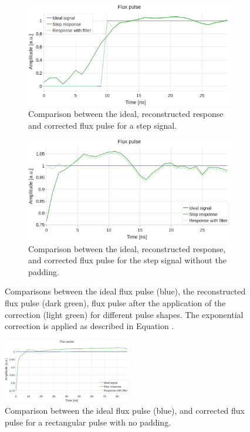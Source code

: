 \begin{figure}[h!]
    \centering
    \begin{subfigure}[t]{0.495\textwidth}
        \includegraphics[width=\textwidth]{figures/png/Cryoscope/filters/step_inverse.png}
        \caption{Comparison between the ideal, reconstructed response and corrected flux pulse for a step signal.}
        \label{fig:inverse:step}
    \end{subfigure}
    \hfill
    \begin{subfigure}[t]{0.495\textwidth}
        \includegraphics[width=\textwidth]{figures/png/Cryoscope/filters/inverse_no_pad.png}
        \caption{Comparison between the ideal, reconstructed response, and corrected flux pulse for the step signal without the padding.}
        \label{fig:inverse:no_pad}
    \end{subfigure}
    \caption{Comparisons between the ideal flux pulse (blue), the reconstructed flux pulse (dark green), flux pulse after the application of the correction (light green) for different pulse shapes.
    The exponential correction is applied as described in Equation \label{eq:inverse}.}
    \label{fig:inverse_short}
\end{figure}

\begin{figure}[h!]
    \centering
    \includegraphics[width=0.5\textwidth]{figures/png/Cryoscope/filters_long/inverse.png}
    \caption{Comparison between the ideal flux pulse (blue), and corrected flux pulse for a rectangular pulse with no padding.}
    \label{fig:inverse:long}
\end{figure}

